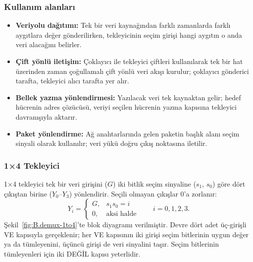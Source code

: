 \subsubsection{Kullanım alanları}
\begin{itemize}[nosep]
  \item \textbf{Veriyolu dağıtımı:} Tek bir veri kaynağından farklı zamanlarda farklı aygıtlara değer gönderilirken, tekleyicinin seçim girişi hangi aygıtın o anda veri alacağını belirler.
  \item \textbf{Çift yönlü iletişim:} Çoklayıcı ile tekleyici çiftleri kullanılarak tek bir hat üzerinden zaman çoğullamalı çift yönlü veri akışı kurulur; çoklayıcı gönderici tarafta, tekleyici alıcı tarafta yer alır.
  \item \textbf{Bellek yazma yönlendirmesi:} Yazılacak veri tek kaynaktan gelir; hedef hücrenin adres çözücüsü, veriyi seçilen hücrenin yazma kapısına tekleyici davranışıyla aktarır.
  \item \textbf{Paket yönlendirme:} Ağ anahtarlarında gelen paketin başlık alanı seçim sinyali olarak kullanılır; veri yükü doğru çıkış noktasına iletilir.
\end{itemize}

\subsubsection{1×4 Tekleyici}
1×4 tekleyici tek bir veri girişini ($G$) iki bitlik seçim sinyaline ($s_1$, $s_0$) göre dört çıkıştan birine ($Y_0$--$Y_3$) yönlendirir. Seçili olmayan çıkışlar 0'a zorlanır:
\[ Y_i = \begin{cases} G, & s_1 s_0 = i \\ 0, & \text{aksi halde} \end{cases} \qquad i = 0, 1, 2, 3. \]
Şekil~\ref{fig:B.demux-1to4}'te blok diyagramı verilmiştir. Devre dört adet üç-girişli VE kapısıyla gerçeklenir; her VE kapısının iki girişi seçim bitlerinin uygun değer ya da tümleyenini, üçüncü girişi de veri sinyalini taşır. Seçim bitlerinin tümleyenleri için iki DEĞİL kapısı yeterlidir.


